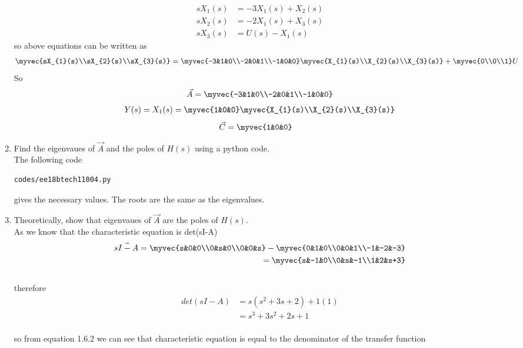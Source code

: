 \begin{enumerate}[label=\thesection.\arabic*.,ref=\thesection.\theenumi]
\begin{align}
sX_{1}(s)&=-3X_{1}(s)+X_{2}(s)\\
sX_{2}(s)&=-2X_{1}(s)+X_{3}(s)\\
sX_{3}(s)&=U(s)-X_{1}(s)
\end{align} 
so above equations can be written as
\begin{align}
\myvec{sX_{1}(s)\\sX_{2}(s)\\sX_{3}(s)}
=
\myvec{-3&1&0\\-2&0&1\\-1&0&0}\myvec{X_{1}(s)\\X_{2}(s)\\X_{3}(s)}
+
\myvec{0\\0\\1}  U
\end{align}
So 
\begin{align}
\vec{A}=\myvec{-3&1&0\\-2&0&1\\-1&0&0}
\end{align}
\begin{align}
Y(s)=X_{1}(s)
=\myvec{1&0&0} \myvec{X_{1}(s)\\X_{2}(s)\\X_{3}(s)}
\end{align}
\begin{align}
\vec{C}&=\myvec{1&0&0}
\end{align}


\item Find the eigenvaues of $\vec{A}$ and the poles of $H(s)$ using a python code.
\\
\solution The following code 
%
\begin{lstlisting}
codes/ee18btech11004.py
\end{lstlisting}
gives the necessary values.  The roots are the same as the eigenvalues.
%
\item Theoretically, show that eigenvaues of $\vec{A}$ are the poles of  $H(s)$.\\
\solution 
As we know that  the characteristic equation is det(sI-A) 
\\\begin{align}
\vec{sI-A}=
\myvec{s&0&0\\0&s&0\\0&0&s}
-
\myvec{0&1&0\\0&0&1\\-1&-2&-3}\\
=\myvec{s&-1&0\\0&s&-1\\1&2&s+3}
\end{align}
\\therefore
\begin{align}
det(sI-A)&=s(s^2+3s+2)+1(1)\\
&=s^3+3s^2+2s+1
\end{align} 
\\so from equation 1.6.2 we can see that characteristic equation is equal to the denominator of the transfer function
\end{enumerate}

